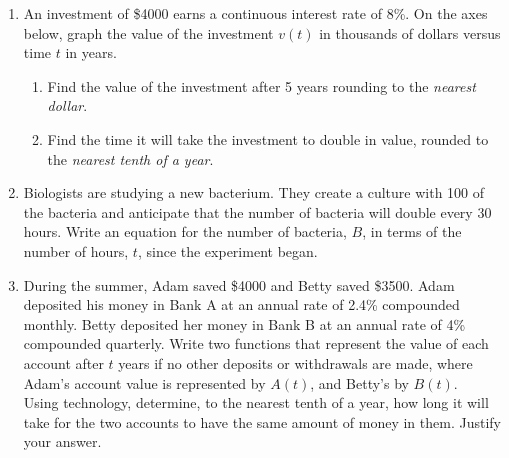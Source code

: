 \documentclass[12pt, twoside]{article}
\begin{document}
\begin{enumerate}[itemsep=0.5cm]
\newpage
\item An investment of \$4000 earns a continuous interest rate of 8\%. On the axes below, graph the value of the investment $v(t)$ in thousands of dollars versus time $t$ in years. 
\begin{center}
    \end{center}
    \begin{enumerate}
        \item Find the value of the investment after 5 years rounding to the \emph{nearest dollar}. \vspace{3cm}
        \item Find the time it will take the investment to double in value, rounded to the \emph{nearest tenth of a year}. 
    \end{enumerate}

\newpage
\item Biologists are studying a new bacterium. They create a culture with 100 of the bacteria and
anticipate that the number of bacteria will double every 30 hours. Write an equation for the
number of bacteria, $B$, in terms of the number of hours, $t$, since the experiment began. %
\vspace{3cm}

\item During the summer, Adam saved \$4000 and Betty saved \$3500. Adam deposited his money in
Bank A at an annual rate of 2.4\% compounded monthly. Betty deposited her money in Bank B at
an annual rate of 4\% compounded quarterly. Write two functions that represent the value of each
account after $t$ years if no other deposits or withdrawals are made, where Adam's account value is represented by $A(t)$, and Betty's by $B(t)$. \\[6cm]
Using technology, determine, to the nearest tenth of a year, how long it will take for the two
accounts to have the same amount of money in them. Justify your answer. %

\end{enumerate}
\end{document}
